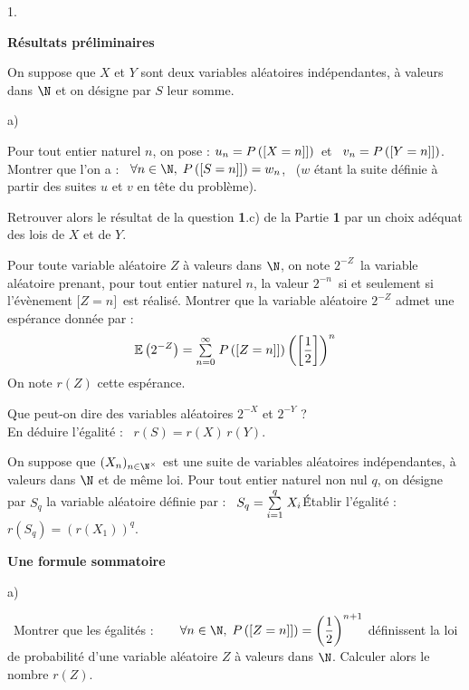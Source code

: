 \documentclass[11pt]{article}%
\begin{document}
\begin{noliste}{1.}
 \setlength{\itemsep}{4mm}
\item \textbf{Résultats préliminaires }

On suppose que $X$ et $Y$ sont deux variables aléatoires indépendantes,
à
valeurs dans $\N$ et on désigne par $S$ leur somme.

\begin{noliste}{a)}
 \setlength{\itemsep}{2mm}
\item Pour tout entier naturel $n$, on pose : $u_{n} = P\left(\left[ {X =
n]} \right]\right)$\ et \ $v_{n} = P\left(\left[ {Y = n]} \right]\right)$. \\
Montrer que l'on a : \ $\forall n\in \N,\;P\left(\Ev{S = n]}\right) =
w_{n}$, \ ($w$ étant la suite définie à partir des suites $u$ et $v$ en
tête du problème).

\item Retrouver alors le résultat de la question \textbf{1}.c) de la
Partie 
\textbf{1} par un choix adéquat des lois de $X$ et de $Y$.

\item Pour toute variable aléatoire $Z$ à valeurs dans $\N$, on note
$2^{-Z}$\ la variable aléatoire prenant, pour tout
entier naturel $n$, la valeur $2^{-n}$\ si et seulement
si l'évènement $\lbrack Z = n]$\ est réalisé. Montrer que
la variable aléatoire $2^{-Z}$ admet une espérance donnée par : 
\[
\mathbb{E}\left( 2^{-Z}\right) = {\textstyle\sum\limits_{n = 0}^{\infty }}\hspace{.1cm}P\left(\left[ {Z =
n]} \right]\right)\left(\left[ { \dfrac{1}{2}} \right]\right) ^{n}
\]
On note $r(Z)$ cette espérance.

\item Que peut-on dire des variables aléatoires $2^{-X}$ et $2^{-Y}$ ? 
\\
En déduire l'égalité : \ $r(S) = r(X)\,r(Y)$.

\item On suppose que $(X_{n})_{n\in \N^{\times }}$ est une suite de
variables aléatoires indépendantes, à valeurs dans $\N$ et de même
loi. Pour tout entier naturel non nul $q$, on désigne par $S_{q}$ la
variable aléatoire définie par : \quad\ $S_{q} = {\textstyle\sum\limits_{i = 1}^{q}}\hspace{.1cm}X_{i}$\.
Établir l'égalité : \ $r(S_{q}) = \left( r(X_{1})\right) ^{q}$.
\end{noliste}

\item \textbf{Une formule sommatoire }

\begin{noliste}{a)}
 \setlength{\itemsep}{2mm}
\item \ Montrer que les égalités :$\qquad \forall n\in
\N,\;P\left(\Ev{Z = n]}\right) = \left( \dfrac{1}{2}\right) ^{n + 1}$
définissent la loi de
probabilité d'une variable aléatoire $Z$ à valeurs dans $\N$.
Calculer alors le nombre $r(Z)$.


\end{noliste}
\end{noliste}
\end{document}
